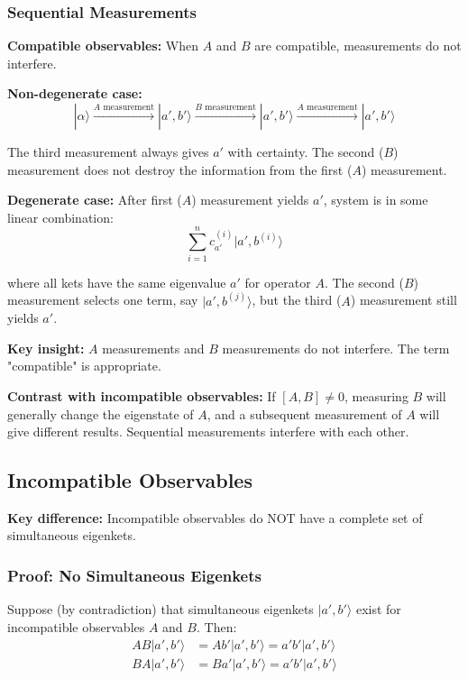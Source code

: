 \documentclass[11pt,a4paper]{article}
\begin{document}
\subsubsection{Sequential Measurements}

\textbf{Compatible observables:} When $A$ and $B$ are compatible, measurements do not interfere.

\textbf{Non-degenerate case:}
\begin{equation}
|\alpha\rangle \xrightarrow{A \text{ measurement}} |a', b'\rangle \xrightarrow{B \text{ measurement}} |a', b'\rangle \xrightarrow{A \text{ measurement}} |a', b'\rangle
\tag{1.133}
\end{equation}

The third measurement always gives $a'$ with certainty. The second ($B$) measurement does not destroy the information from the first ($A$) measurement.

\textbf{Degenerate case:}
After first ($A$) measurement yields $a'$, system is in some linear combination:
\begin{equation}
\sum_{i=1}^n c_{a'}^{(i)}|a', b^{(i)}\rangle
\tag{1.134}
\end{equation}

where all kets have the same eigenvalue $a'$ for operator $A$. The second ($B$) measurement selects one term, say $|a', b^{(j)}\rangle$, but the third ($A$) measurement still yields $a'$.

\textbf{Key insight:} $A$ measurements and $B$ measurements do not interfere. The term "compatible" is appropriate.

\textbf{Contrast with incompatible observables:}
If $[A, B] \neq 0$, measuring $B$ will generally change the eigenstate of $A$, and a subsequent measurement of $A$ will give different results. Sequential measurements interfere with each other.

\subsection{Incompatible Observables}

\textbf{Key difference:} Incompatible observables do NOT have a complete set of simultaneous eigenkets.

\subsubsection{Proof: No Simultaneous Eigenkets}

Suppose (by contradiction) that simultaneous eigenkets $|a', b'\rangle$ exist for incompatible observables $A$ and $B$. Then:
\begin{align}
AB|a', b'\rangle &= Ab'|a', b'\rangle = a'b'|a', b'\rangle \tag{1.135} \\
BA|a', b'\rangle &= Ba'|a', b'\rangle = a'b'|a', b'\rangle \tag{1.136}
\end{align}
\end{document}
